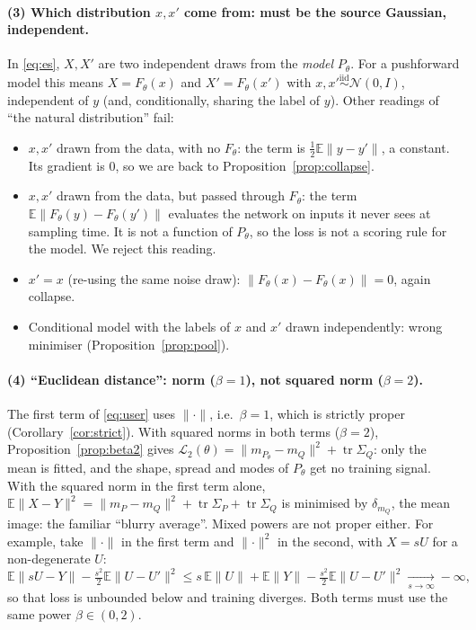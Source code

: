 \documentclass[11pt]{article}
\theoremstyle{definition}
\theoremstyle{remark}
\newcommand{\E}{\mathbb{E}}
\newcommand{\N}{\mathcal{N}}
\newcommand{\norm}[1]{\lVert #1\rVert}
\begin{document}
\paragraph{(3) Which distribution $x,x'$ come from: must be the source Gaussian, independent.} In
\eqref{eq:es}, $X,X'$ are two independent draws from the \emph{model} $P_\theta$. For a pushforward model
this means $X=F_\theta(x)$ and $X'=F_\theta(x')$ with $x,x'\overset{\text{iid}}{\sim}\N(0,I)$, independent of
$y$ (and, conditionally, sharing the label of $y$). Other readings of ``the natural distribution'' fail:
\begin{itemize}
\item $x,x'$ drawn from the data, with no $F_\theta$: the term is $\tfrac12\E\norm{y-y'}$, a constant. Its
gradient is $0$, so we are back to Proposition~\ref{prop:collapse}.
\item $x,x'$ drawn from the data, but passed through $F_\theta$: the term $\E\norm{F_\theta(y)-F_\theta(y')}$
evaluates the network on inputs it never sees at sampling time. It is not a function of $P_\theta$, so the
loss is not a scoring rule for the model. We reject this reading.
\item $x'=x$ (re-using the same noise draw): $\norm{F_\theta(x)-F_\theta(x)}=0$, again collapse.
\item Conditional model with the labels of $x$ and $x'$ drawn independently: wrong minimiser
(Proposition~\ref{prop:pool}).
\end{itemize}

\paragraph{(4) ``Euclidean distance'': norm ($\beta=1$), not squared norm ($\beta=2$).} The first term
of \eqref{eq:user} uses $\norm{\cdot}$, i.e.\ $\beta=1$, which is strictly proper (Corollary~\ref{cor:strict}).
With squared norms in both terms ($\beta=2$), Proposition~\ref{prop:beta2} gives
$\mathcal L_2(\theta)=\norm{m_{P_\theta}-m_Q}^2+\operatorname{tr}\Sigma_Q$: only the mean is fitted, and the
shape, spread and modes of $P_\theta$ get no training signal. With the squared norm in the first term alone,
$\E\norm{X-Y}^2=\norm{m_P-m_Q}^2+\operatorname{tr}\Sigma_P+\operatorname{tr}\Sigma_Q$ is minimised by
$\delta_{m_Q}$, the mean image: the familiar ``blurry average''. Mixed powers are not proper either. For
example, take $\norm{\cdot}$ in the first term and $\norm{\cdot}^2$ in the second, with $X=sU$ for a
non-degenerate $U$:
\[
\E\norm{sU-Y}-\tfrac{s^2}{2}\E\norm{U-U'}^2\le s\,\E\norm U+\E\norm Y-\tfrac{s^2}{2}\E\norm{U-U'}^2\xrightarrow[s\to\infty]{}-\infty,
\]
so that loss is unbounded below and training diverges. Both terms must use the same power $\beta\in(0,2)$.
\end{document}
